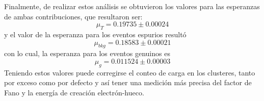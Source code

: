 \indent Finalmente, de realizar estos análisis se obtuvieron los valores para las esperanzas de ambas contribuciones, que resultaron ser:
\begin{equation*}
    \mu_{T} = 0.19735 \pm 0.00024
\end{equation*} 
y el valor de la esperanza para los eventos espurios resultó 
\begin{equation*}
    \mu_{bkg} = 0.18583 \pm 0.00021
\end{equation*}
con lo cual, la esperanza para los eventos genuinos es 
\begin{equation*}
    \mu_{g} = 0.011524 \pm 0.00003
\end{equation*}
Teniendo estos valores puede corregirse el conteo de carga en los clusteres, tanto por exceso como por defecto y así tener una medición más precisa del factor de Fano y la energía de creación electrón-hueco.

